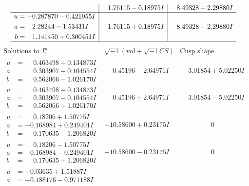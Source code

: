 \documentclass[1p]{elsarticle_modified}
\theoremstyle{definition}
\newcommand{\I}{\sqrt{-1}}
\begin{document}
$$\begin{array}{c|c|c}
 & \phantom{-}1.76115 - 0.18975 I & \phantom{-}8.49328 - 2.29880 I \\ \hline\begin{aligned}
u &= -0.287870 - 0.421955 I \\
a &= \phantom{-}2.28244 - 1.53431 I \\
b &= \phantom{-}1.141450 + 0.300451 I\end{aligned}
 & \phantom{-}1.76115 + 0.18975 I & \phantom{-}8.49328 + 2.29880 I\\
 \hline 
 \end{array}$$\newpage$$\begin{array}{c|c|c}  
\text{Solutions to }I^u_{1}& \I (\text{vol} + \sqrt{-1}CS) & \text{Cusp shape}\\
 \hline 
\begin{aligned}
u &= \phantom{-}0.463498 + 0.134873 I \\
a &= \phantom{-}0.303907 + 0.104554 I \\
b &= \phantom{-}0.562066 - 1.026170 I\end{aligned}
 & \phantom{-}0.45196 - 2.64971 I & \phantom{-}3.01854 + 5.02250 I \\ \hline\begin{aligned}
u &= \phantom{-}0.463498 - 0.134873 I \\
a &= \phantom{-}0.303907 - 0.104554 I \\
b &= \phantom{-}0.562066 + 1.026170 I\end{aligned}
 & \phantom{-}0.45196 + 2.64971 I & \phantom{-}3.01854 - 5.02250 I \\ \hline\begin{aligned}
u &= \phantom{-}0.18206 + 1.50775 I \\
a &= -0.168984 + 0.249401 I \\
b &= \phantom{-}0.170635 - 1.206820 I\end{aligned}
 & -10.58600 + 0.23175 I & \phantom{-0.000000 } 0 \\ \hline\begin{aligned}
u &= \phantom{-}0.18206 - 1.50775 I \\
a &= -0.168984 - 0.249401 I \\
b &= \phantom{-}0.170635 + 1.206820 I\end{aligned}
 & -10.58600 - 0.23175 I & \phantom{-0.000000 } 0 \\ \hline\begin{aligned}
u &= -0.03635 + 1.51887 I \\
a &= -0.188176 - 0.971188 I \\

\end{aligned}
\end{array}$$
\end{document}
